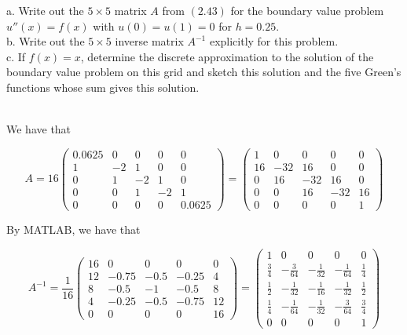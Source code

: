 a. Write out the $5\times5$ matrix $A$ from $(2.43)$ for the boundary value problem $u''(x)=f(x)$ with
$u(0)=u(1)=0$ for $h=0.25$.\\
b. Write out the $5\times5$ inverse matrix $A^{-1}$ explicitly for this problem.\\
c. If $f(x)=x$, determine the discrete approximation to the solution of the boundary value problem on
this grid and sketch this solution and the five Green's functions whose sum gives this solution.
 
\begin{solution}\renewcommand{\qedsymbol}{}\ \\
    We have that
    
    $$A=16\left(\begin{array}{ccccc} 0.0625 & 0 & 0 & 0 & 0 \\ 1 & -2 & 1 & 0 & 0 \\ 0 & 1 & -2 & 1 & 0
                                  \\ 0 & 0 & 1 & -2 & 1 \\ 0 & 0 & 0 & 0 & 0.0625 \end{array}\right)=
          \left(\begin{array}{ccccc} 1 & 0 & 0 & 0 & 0 \\ 16 & -32 & 16 & 0 & 0 \\ 0 & 16 & -32 & 16 & 0
                                  \\ 0 & 0 & 16 & -32 & 16 \\ 0 & 0 & 0 & 0 & 1 \end{array}\right)$$

    By MATLAB, we have that
    
    $$A^{-1}=\frac{1}{16}\left(\begin{array}{ccccc} 16 & 0 & 0 & 0 & 0
                                                 \\ 12 & -0.75 & -0.5 & -0.25 & 4
                                                 \\ 8 & -0.5 & -1 & -0.5 & 8
                                                 \\ 4 & -0.25 & -0.5 & -0.75 & 12
                                                 \\ 0 & 0 & 0 & 0 & 16
                         \end{array}\right)=
    \left(\begin{array}{ccccc} 1 & 0 & 0 & 0 & 0 
                        \\ \frac34 & -\frac{3}{64} & -\frac{1}{32} & -\frac{1}{64} & \frac14
                        \\ \frac12 & -\frac{1}{32} & -\frac{1}{16} & -\frac{1}{32} & \frac12
                        \\ \frac14 & -\frac{1}{64} & -\frac{1}{32} & -\frac{3}{64} & \frac34
                        \\ 0 & 0 & 0 & 0 & 1 
    \end{array}\right)$$


\end{solution}
